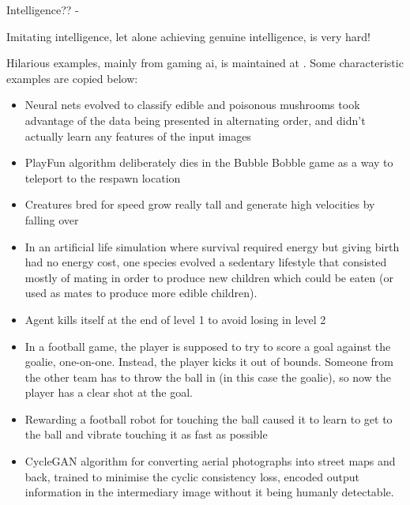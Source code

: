 %
%
%

\begin{frame}[t,allowframebreaks]{Intelligence?? -} 

    Imitating intelligence, let alone achieving genuine 
    intelligence, is very hard!\\
    \vspace{0.2cm}

    Hilarious examples, mainly from gaming \gls{ai}, 
    is maintained at \cite{GoogDoc:GamingExamplesinAI}.
    Some characteristic examples are copied below:\\
    \vspace{0.2cm}

    \begin{itemize}
        \small
        \item 
        Neural nets evolved to classify edible and poisonous 
        mushrooms took advantage of the data being presented 
        in alternating order, and didn't actually learn any 
        features of the input images \cite{Lehman:2019Surprising}
        \item 
        PlayFun algorithm deliberately dies in the Bubble Bobble 
        game as a way to teleport to the respawn location
        \item 
        Creatures bred for speed grow really tall and 
        generate high velocities by falling over
        \item 
        In an artificial life simulation where survival required 
        energy but giving birth had no energy cost, one species 
        evolved a sedentary lifestyle that consisted mostly of 
        mating in order to produce new children which could be 
        eaten (or used as mates to produce more edible children).
        \item 
        Agent kills itself at the end of level 1 to avoid losing in level 2
        \item 
        In a football game, the player is supposed to try 
        to score a goal against the goalie, one-on-one. 
        Instead, the player kicks it out of bounds. 
        Someone from the other team has to throw the 
        ball in (in this case the goalie), so now the player has a clear shot at the goal.
        \item 
        Rewarding a football robot for touching the ball 
        caused it to learn to get to the ball and vibrate 
        touching it as fast as possible
        \item 
        CycleGAN algorithm for converting aerial photographs 
        into street maps and back, trained to minimise the cyclic 
        consistency loss, encoded output information in the intermediary 
        image without it being humanly detectable.
    \end{itemize}        


\end{frame}
